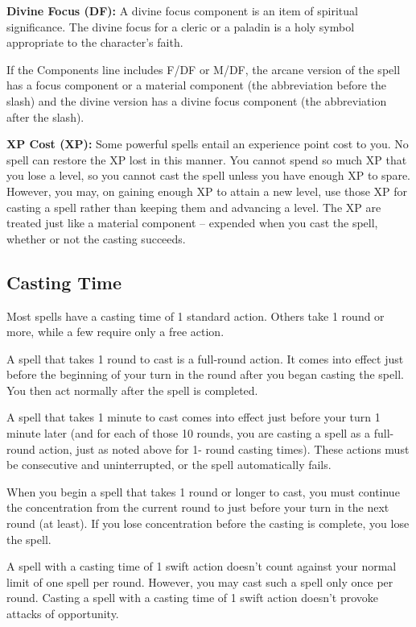 \textbf{Divine Focus (DF):} A divine focus component is an item of spiritual significance. 
The divine focus for a cleric or a paladin is a holy symbol appropriate to the 
character's faith. 

If the Components line includes F/DF or M/DF, the arcane version of the spell has 
a focus component or a material component (the abbreviation before the slash) and 
the divine version has a divine focus component (the abbreviation after the slash).

\textbf{XP Cost (XP):} Some powerful spells entail an experience point cost to 
you. No spell can restore the XP lost in this manner. You cannot spend so much 
XP that you lose a level, so you cannot cast the spell unless you have enough XP 
to spare. However, you may, on gaining enough XP to attain a new level, use those 
XP for casting a spell rather than keeping them and advancing a level. The XP are 
treated just like a material component -- expended when you cast the spell, whether 
or not the casting succeeds.

\subsection{Casting Time}

Most spells have a casting time of 1 standard action. Others take 1 round or more, 
while a few require only a free action.

A spell that takes 1 round to cast is a full-round action. It comes into effect 
just before the beginning of your turn in the round after you began casting the 
spell. You then act normally after the spell is completed.

A spell that takes 1 minute to cast comes into effect just before your turn 1 minute 
later (and for each of those 10 rounds, you are casting a spell as a full-round 
action, just as noted above for 1- round casting times). These actions must be 
consecutive and uninterrupted, or the spell automatically fails.

When you begin a spell that takes 1 round or longer to cast, you must continue 
the concentration from the current round to just before your turn in the next round 
(at least). If you lose concentration before the casting is complete, you lose 
the spell.

A spell with a casting time of 1 swift action doesn't count against your normal 
limit of one spell per round. However, you may cast such a spell only once per 
round. Casting a spell with a casting time of 1 swift action doesn't provoke attacks 
of opportunity.

